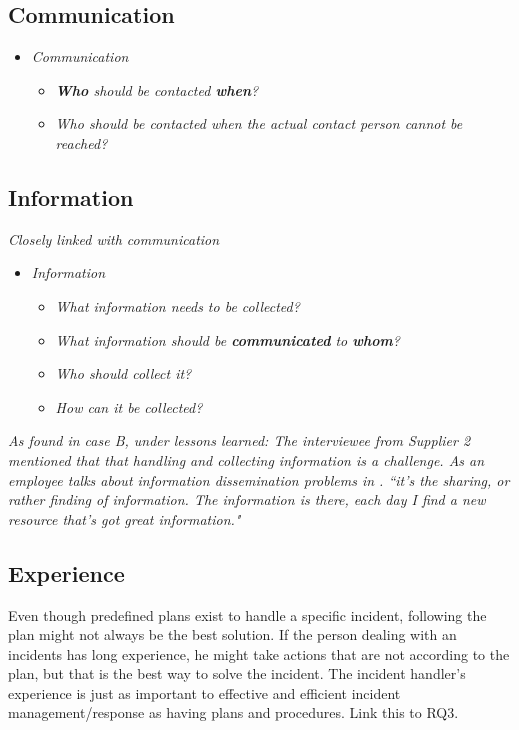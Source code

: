 \subsection{Communication}
\begin{itemize}
\item \textit{Communication}
\begin{itemize}
\item \textit{\textbf{Who} should be contacted \textbf{when}?}
\item \textit{Who should be contacted when the actual contact person cannot be reached?}
\end{itemize}
\end{itemize}

\subsection{Information}
\textit{Closely linked with communication}

\begin{itemize}
\item \textit{Information}
\begin{itemize}
\item \textit{What information needs to be collected?}
\item \textit{What information should be \textbf{communicated} to \textbf{whom}?}
\item \textit{Who should collect it?}
\item \textit{How can it be collected?}
\end{itemize}
\end{itemize}

\textit{As found in case B, under lessons learned:
The interviewee from Supplier 2 mentioned that that handling and collecting information is a challenge. As an employee talks about information dissemination problems in \cite{ahmad2012incident}.
``it's the sharing, or rather finding of information. The information is there, each day I find a new resource that's got great information."}

\subsection{Experience}

Even though predefined plans exist to handle a specific incident, following the plan might not always be the best solution. If the person dealing with an incidents has long experience, he might take actions that are not according to the plan, but that is the best way to solve the incident. The incident handler's experience is just as important to effective and efficient incident management/response as having plans and procedures. Link this to RQ3.

